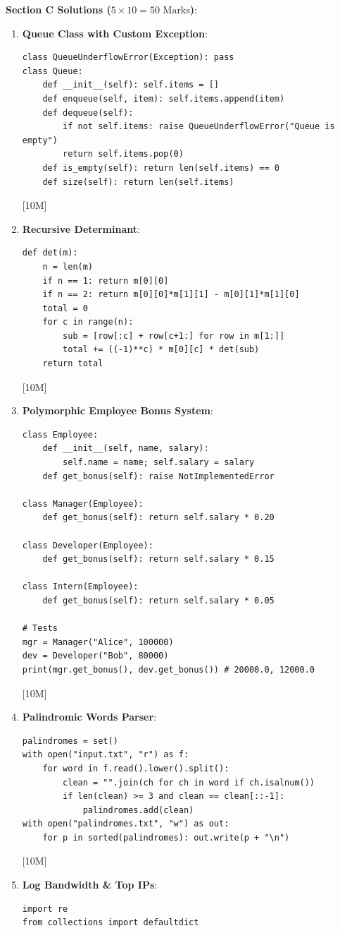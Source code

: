 \begin{solutionbox}
\medskip
\noindent\textbf{Section C Solutions ($5 \times 10 = 50\text{ Marks}$)}:
\begin{enumerate}[start=17]
    \item \textbf{Queue Class with Custom Exception}:
    \begin{lstlisting}[language=Python3]
class QueueUnderflowError(Exception): pass
class Queue:
    def __init__(self): self.items = []
    def enqueue(self, item): self.items.append(item)
    def dequeue(self):
        if not self.items: raise QueueUnderflowError("Queue is empty")
        return self.items.pop(0)
    def is_empty(self): return len(self.items) == 0
    def size(self): return len(self.items)
    \end{lstlisting} [10M]
    \item \textbf{Recursive Determinant}:
    \begin{lstlisting}[language=Python3]
def det(m):
    n = len(m)
    if n == 1: return m[0][0]
    if n == 2: return m[0][0]*m[1][1] - m[0][1]*m[1][0]
    total = 0
    for c in range(n):
        sub = [row[:c] + row[c+1:] for row in m[1:]]
        total += ((-1)**c) * m[0][c] * det(sub)
    return total
    \end{lstlisting} [10M]
    \item \textbf{Polymorphic Employee Bonus System}:
    \begin{lstlisting}[language=Python3]
class Employee:
    def __init__(self, name, salary):
        self.name = name; self.salary = salary
    def get_bonus(self): raise NotImplementedError

class Manager(Employee):
    def get_bonus(self): return self.salary * 0.20

class Developer(Employee):
    def get_bonus(self): return self.salary * 0.15

class Intern(Employee):
    def get_bonus(self): return self.salary * 0.05

# Tests
mgr = Manager("Alice", 100000)
dev = Developer("Bob", 80000)
print(mgr.get_bonus(), dev.get_bonus()) # 20000.0, 12000.0
    \end{lstlisting} [10M]
    \item \textbf{Palindromic Words Parser}:
    \begin{lstlisting}[language=Python3]
palindromes = set()
with open("input.txt", "r") as f:
    for word in f.read().lower().split():
        clean = "".join(ch for ch in word if ch.isalnum())
        if len(clean) >= 3 and clean == clean[::-1]:
            palindromes.add(clean)
with open("palindromes.txt", "w") as out:
    for p in sorted(palindromes): out.write(p + "\n")
    \end{lstlisting} [10M]
    \item \textbf{Log Bandwidth \& Top IPs}:
    \begin{lstlisting}[language=Python3]
import re
from collections import defaultdict


\end{lstlisting}
\end{enumerate}
\end{solutionbox}
